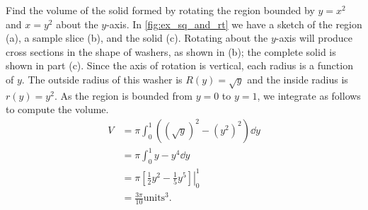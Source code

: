 \begin{example}\label{ex_wash_3}
Find the volume of the solid formed by rotating the region bounded by $y=x^2$ and $x=y^2$ about the $y$-axis.
\solution
In \autoref{fig:ex_sq_and_rt} we have a sketch of the region (a), a sample slice (b), and the solid (c). Rotating about the $y$-axis will produce cross sections in the shape of washers, as shown in (b); the complete solid is shown in  part (c). Since the axis of rotation is vertical, each radius is a function of $y$. The outside radius of this washer is $R(y)=\sqrt y$ and the inside radius is $r(y)=y^2$. As the region is bounded from $y=0$ to $y=1$, we integrate as follows to compute the volume. 
\begin{align*}
V&=\pi \int_0^1 \left((\sqrt y)^2-(y^2)^2\right) \dd y\\
&=\pi \int_0^1 y-y^4 \dd y\\
&=\pi\left.\left[\frac{1}{2} y^2-\frac{1}{5} y^5\right] \right|_0^1\\
&=\frac{3\pi}{10} \text{units}^3.
\end{align*}
\end{example}

